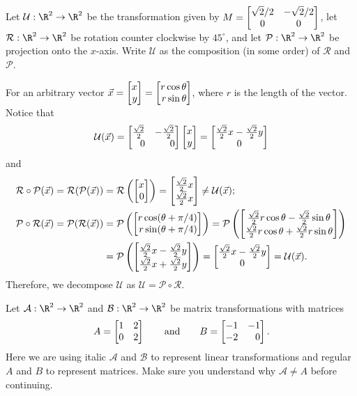 \begin{example}
	Let $\mathcal U:\R^2\to\R^2$ be the transformation given by $M=\begin{bmatrix}\sqrt{2}/2&-\sqrt{2}/2\\0&0\end{bmatrix}$,
	let $\mathcal R:\R^2\to\R^2$ be rotation counter clockwise by $45^\circ$, and let $\mathcal P:\R^2\to\R^2$
	be projection onto the $x$-axis.
	Write $\mathcal U$ as the composition (in some order) of $\mathcal R$ and $\mathcal P$.

	For an arbitrary vector $\vec x=\mat{x\\y}=\mat{r\cos\theta\\r\sin\theta}$, where $r$ is the length of the vector. Notice that
	\[
	    \mathcal U(\vec x)=\mat{\frac{\sqrt{2}}{2}&-\frac{\sqrt{2}}{2}\\0&0}\mat{x\\y}=\matc{\frac{\sqrt{2}}{2} x-\frac{\sqrt{2}}{2} y\\0}
	\]
	and
	\begin{align*}
	    \mathcal R\circ \mathcal P(\vec x)=\mathcal R(\mathcal P(\vec x))&=\mathcal R\left(\mat{x\\0}\right)=\mat{\frac{\sqrt{2}}{2} x\\\frac{\sqrt{2}}{2} x}\neq\mathcal U(\vec x);\\ 
	    \mathcal P\circ \mathcal R(\vec x)=\mathcal P(\mathcal R(\vec x))&=\mathcal P\left(\mat{r\cos(\theta+\pi/4)\\r\sin(\theta+\pi/4)}\right)=\mathcal P\left(\matc{\frac{\sqrt{2}}{2}r\cos\theta - \frac{\sqrt{2}}{2}\sin \theta\\\frac{\sqrt{2}}{2}r\cos\theta + \frac{\sqrt{2}}{2}r\sin\theta}\right)\\
	    &=\mathcal P\left(\mat{\frac{\sqrt{2}}{2}x-\frac{\sqrt{2}}{2}y\\\frac{\sqrt{2}}{2}x+\frac{\sqrt{2}}{2}y}\right)=\matc{\frac{\sqrt{2}}{2}x-\frac{\sqrt{2}}{2}y\\0}=\mathcal U(\vec x).
	\end{align*}
	Therefore, we decompose $\mathcal U$ as $\mathcal U=\mathcal P\circ \mathcal R$.
\end{example}


Let $\mathcal A:\R^2\to\R^2$ and $\mathcal B:\R^2\to\R^2$ be matrix transformations with matrices
\[
	A=\mat{1&2\\0&2}\qquad\text{and}\qquad B=\mat{-1&-1\\-2&0}.
\]
Here we are using italic $\mathcal A$ and $\mathcal B$ to represent linear transformations and regular $A$ and $B$ to represent
matrices. Make sure you understand why $\mathcal A\neq A$ before continuing.


